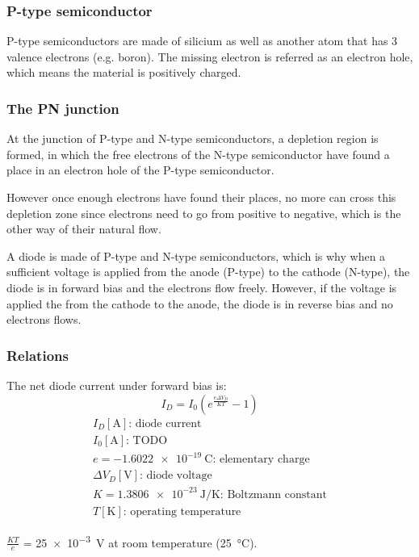 \documentclass[10pt, twocolumn]{article}
\begin{document}
\subsubsection{P-type semiconductor}
P-type semiconductors are made of silicium as well as another atom that has 3 valence electrons (e.g. boron).
The missing electron is referred as an electron hole, which means the material is positively charged.


\subsubsection{The PN junction}
At the junction of P-type and N-type semiconductors, a depletion region is formed, in which the free electrons of the N-type semiconductor have found a place in an electron hole of the P-type semiconductor.

However once enough electrons have found their places, no more can cross this depletion zone since electrons need to go from positive to negative, which is the other way of their natural flow.

A diode is made of P-type and N-type semiconductors, which is why when a sufficient voltage is applied from the anode (P-type) to the cathode (N-type), the diode is in forward bias and the electrons flow freely.
However, if the voltage is applied the from the cathode to the anode, the diode is in reverse bias and no electrons flows.


\subsubsection{Relations}
The net diode current under forward bias is:
\[
  I_D = I_0 \left( e^{\frac{e \Delta V_D}{KT}} - 1\right)
\]
\[
  \begin{array}{|l}
    I_D [\si{\ampere}] \text{: diode current}                          \\
    I_0 [\si{\ampere}] \text{: TODO}                                   \\
    e = \SI{-1.6022e-19}{\coulomb} \text{: elementary charge}          \\
    \Delta V_D [\si{\volt}] \text{: diode voltage}                     \\
    K = \SI{1.3806e-23}{\joule\per\kelvin} \text{: Boltzmann constant} \\
    T [\si{\kelvin}] \text{: operating temperature}
  \end{array}
\]

\begin{remark}
  \(\frac{KT}{e}\) = \SI{25e-3}{\volt} at room temperature (\SI{25}{\celsius}).
\end{remark}
\end{document}
